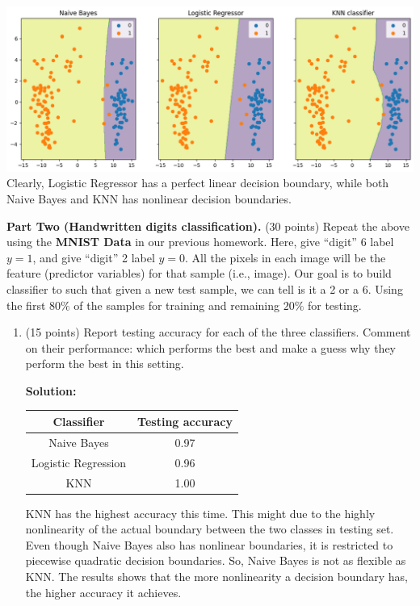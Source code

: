 \documentclass[twoside,10pt]{article}
\begin{document}
\begin{enumerate}
\begin{enumerate}
\begin{tcolorbox}
\includegraphics[width=\linewidth]{divorce.png}
Clearly, Logistic Regressor has a perfect linear decision boundary, while both Naive Bayes and KNN has nonlinear decision boundaries. 


\end{tcolorbox}
	
\end{enumerate}

\textbf{Part Two (Handwritten digits classification).} (30 points) Repeat the above using the \textbf{MNIST Data} in our previous homework. Here, give ``digit'' 6 label $y = 1$, and give ``digit'' 2 label $y = 0$. All the pixels in each image will be the feature (predictor variables) for that sample (i.e., image). Our goal is to build classifier to such that given a new test sample, we can tell is it a 2 or a 6. Using the first $80\%$ of the samples for training and remaining $20\%$ for testing. 
\begin{enumerate}
\item (15 points) Report testing accuracy for each of the three classifiers.  Comment on their performance: which performs the best and make a guess why they perform the best in this setting. 
\begin{tcolorbox}
\textbf{Solution:}\\
\begin{center}
	\begin{tabular}{| c | c |}%
	\hline
	Classifier & Testing accuracy \\
	\hline
        Naive Bayes & 0.97 \\%
        \hline
        Logistic Regression &0.96\\%
        \hline
        KNN & 1.00\\
        \hline
        \end{tabular}
        \end{center}
KNN has the highest accuracy this time. This might due to the highly nonlinearity of the actual boundary between the two classes in testing set. Even though Naive Bayes also has nonlinear boundaries, it is restricted to piecewise quadratic decision boundaries. So, Naive Bayes is not as flexible as KNN. The results shows that the more nonlinearity a decision boundary has, the higher accuracy it achieves. 
\end{tcolorbox}


\end{enumerate}
\end{enumerate}
\end{document}
